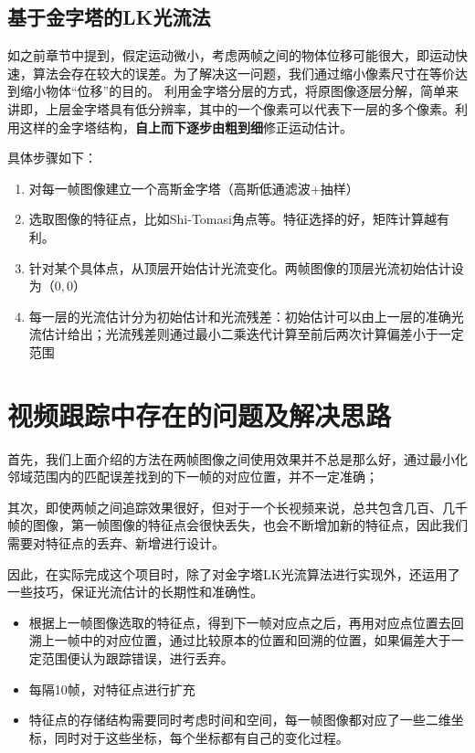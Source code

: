 \documentclass[UTF8]{ctexart}
\begin{document}
\begin{CJK*}{UTF8}{gbsn}
\subsection{基于金字塔的LK光流法}
如之前章节中提到，假定运动微小，考虑两帧之间的物体位移可能很大，即运动快速，算法会存在较大的误差。为了解决这一问题，我们通过缩小像素尺寸在等价达到缩小物体“位移”的目的。
利用金字塔分层的方式，将原图像逐层分解，简单来讲即，上层金字塔具有低分辨率，其中的一个像素可以代表下一层的多个像素。利用这样的金字塔结构，\textbf{自上而下逐步由粗到细}修正运动估计。

具体步骤如下：
\begin{enumerate}
    \item 对每一帧图像建立一个高斯金字塔（高斯低通滤波+抽样）
    \item 选取图像的特征点，比如Shi-Tomasi角点等。特征选择的好，矩阵计算越有利。
    \item 针对某个具体点，从顶层开始估计光流变化。两帧图像的顶层光流初始估计设为$（0,0）$
    \item 每一层的光流估计分为初始估计和光流残差：初始估计可以由上一层的准确光流估计给出；光流残差则通过最小二乘迭代计算至前后两次计算偏差小于一定范围
\end{enumerate}


\section{视频跟踪中存在的问题及解决思路}

首先，我们上面介绍的方法在两帧图像之间使用效果并不总是那么好，通过最小化邻域范围内的匹配误差找到的下一帧的对应位置，并不一定准确；

其次，即使两帧之间追踪效果很好，但对于一个长视频来说，总共包含几百、几千帧的图像，第一帧图像的特征点会很快丢失，也会不断增加新的特征点，因此我们需要对特征点的丢弃、新增进行设计。

因此，在实际完成这个项目时，除了对金字塔LK光流算法进行实现外，还运用了一些技巧，保证光流估计的长期性和准确性。
\begin{itemize}
    \item 根据上一帧图像选取的特征点，得到下一帧对应点之后，再用对应点位置去回溯上一帧中的对应位置，通过比较原本的位置和回溯的位置，如果偏差大于一定范围便认为跟踪错误，进行丢弃。
    \item 每隔10帧，对特征点进行扩充
    \item 特征点的存储结构需要同时考虑时间和空间，每一帧图像都对应了一些二维坐标，同时对于这些坐标，每个坐标都有自己的变化过程。
\end{itemize}



\end{CJK*}
\end{document}
